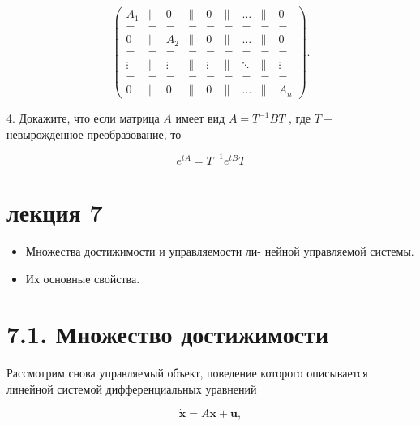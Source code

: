 \documentclass[8pt]{extarticle}
\begin{document}
\[
\left( \begin{array}{ccccccccc} {A}_{1} &  \parallel  & 0 &  \parallel  & 0 &  \parallel  & \ldots &  \parallel  & 0 \\   - &  - &  - &  - &  - &  - &  - &  - &  - \\  0 &  \parallel  & {A}_{2} &  \parallel  & 0 &  \parallel  & \ldots &  \parallel  & 0 \\   - &  - &  - &  - &  - &  - &  - &  - &  - \\  \vdots &  \parallel  & \vdots &  \parallel  & \vdots &  \parallel  &  \ddots  &  \parallel  & \vdots \\   - &  - &  - &  - &  - &  - &  - &  - &  - \\  0 &  \parallel  & 0 &  \parallel  & 0 &  \parallel  & \ldots &  \parallel  & {A}_{n} \end{array}\right) .
\]

4. Докажите, что если матрица \(A\) имеет вид \(A = {T}^{-1}{BT}\) , где \(T -\) невырожденное преобразование, то

\[
{e}^{tA} = {T}^{-1}{e}^{tB}T
\]

\section*{лекция 7}

\begin{itemize}\relax
\item\relax Множества достижимости и управляемости ли- нейной управляемой системы.
\end{itemize}

\begin{itemize}\relax
\item\relax Их основные свойства.
\end{itemize}

\section*{7.1. Множество достижимости}

Рассмотрим снова управляемый объект, поведение которого описывается линейной системой дифференциальных уравнений

\[
\dot{\mathbf{x}} = A\mathbf{x} + \mathbf{u}, \tag{7.1}
\]
\end{document}
